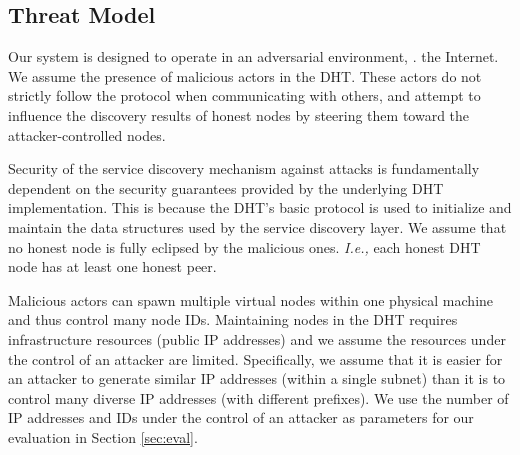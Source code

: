 \subsection{Threat Model}
Our system is designed to operate in an adversarial environment, \ie. the Internet. We assume the presence of malicious actors in the DHT. These actors do not strictly follow the protocol when communicating with others, and attempt to influence the discovery results of honest nodes by steering them toward the attacker-controlled nodes.

Security of the service discovery mechanism against attacks is fundamentally dependent on the security guarantees provided by the underlying DHT implementation. This is because the DHT's basic protocol is used to initialize and maintain the data structures used by the service discovery layer. We assume that no honest node is fully eclipsed by the malicious ones. \textit{I.e.,} each honest DHT node has at least one honest peer. 

Malicious actors can spawn multiple virtual nodes within one physical machine and thus control many node IDs. Maintaining nodes in the DHT requires infrastructure resources (public IP addresses) and we assume the resources under the control of an attacker are limited. Specifically, we assume that it is easier for an attacker to generate similar IP addresses (\ie within a single subnet) than it is to control many diverse IP addresses (with different prefixes). We use the number of IP addresses and IDs under the control of an attacker as parameters for our evaluation in Section \ref{sec:eval}.

